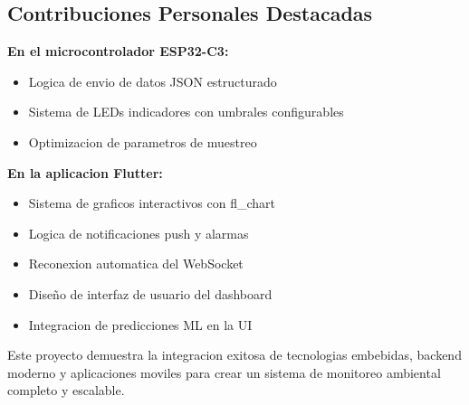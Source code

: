 \documentclass[11pt,letterpaper]{article}
\begin{document}
\subsection{Contribuciones Personales Destacadas}
\textbf{En el microcontrolador ESP32-C3:}
\begin{itemize}
    \item Logica de envio de datos JSON estructurado
    \item Sistema de LEDs indicadores con umbrales configurables
    \item Optimizacion de parametros de muestreo
\end{itemize}

\textbf{En la aplicacion Flutter:}
\begin{itemize}
    \item Sistema de graficos interactivos con fl\_chart
    \item Logica de notificaciones push y alarmas
    \item Reconexion automatica del WebSocket
    \item Diseño de interfaz de usuario del dashboard
    \item Integracion de predicciones ML en la UI
\end{itemize}

\vspace{0.5cm}
\noindent Este proyecto demuestra la integracion exitosa de tecnologias embebidas, backend moderno y aplicaciones moviles para crear un sistema de monitoreo ambiental completo y escalable.
\end{document}
